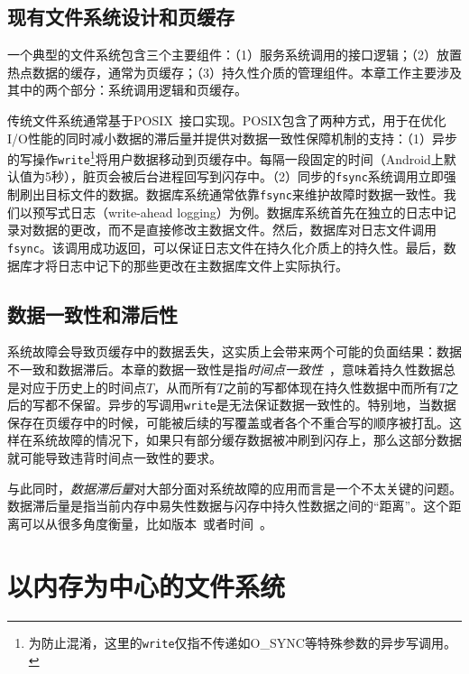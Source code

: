 \subsection{现有文件系统设计和页缓存}

一个典型的文件系统包含三个主要组件：（1）服务系统调用的接口逻辑；（2）放置热点数据的缓存，通常为页缓存；（3）持久性介质的管理组件。本章工作主要涉及其中的两个部分：系统调用逻辑和页缓存。

传统文件系统通常基于POSIX~\cite{POSIX}接口实现。POSIX包含了两种方式，用于在优化I/O性能的同时减小数据的滞后量并提供对数据一致性保障机制的支持：（1）异步的写操作\texttt{write}\footnote{为防止混淆，这里的\texttt{write}仅指不传递如O\_SYNC等特殊参数的异步写调用。}将用户数据移动到页缓存中。每隔一段固定的时间（Android上默认值为5秒），脏页会被后台进程回写到闪存中。（2）同步的\texttt{fsync}系统调用立即强制刷出目标文件的数据。数据库系统通常依靠\texttt{fsync}来维护故障时数据一致性。我们以预写式日志（write-ahead logging）为例。数据库系统首先在独立的日志中记录对数据的更改，而不是直接修改主数据文件。然后，数据库对日志文件调用\texttt{fsync}。该调用成功返回，可以保证日志文件在持久化介质上的持久性。最后，数据库才将日志中记下的那些更改在主数据库文件上实际执行。

\subsection{数据一致性和滞后性}

系统故障会导致页缓存中的数据丢失，这实质上会带来两个可能的负面结果：数据不一致和数据滞后。本章的数据一致性是指\emph{时间点一致性}~\cite{point-in-time-consist}，意味着持久性数据总是对应于历史上的时间点$T$，从而所有$T$之前的写都体现在持久性数据中而所有$T$之后的写都不保留。异步的写调用\texttt{write}是无法保证数据一致性的。特别地，当数据保存在页缓存中的时候，可能被后续的写覆盖或者各个不重合写的顺序被打乱。这样在系统故障的情况下，如果只有部分缓存数据被冲刷到闪存上，那么这部分数据就可能导致违背时间点一致性的要求。

与此同时，\emph{数据滞后量}对大部分面对系统故障的应用而言是一个不太关键的问题。数据滞后量是指当前内存中易失性数据与闪存中持久性数据之间的“距离”。这个距离可以从很多角度衡量，比如版本~\cite{Bailis:2012:PBS:2212351.2212359}或者时间~\cite{Ports:2010:TCA:1924943.1924963}。

\section{以内存为中心的文件系统}

